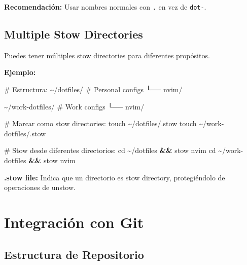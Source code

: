 \documentclass[
  doc,
  floatsintext,
  longtable,
  a4paper,
  nolmodern,
  notxfonts,
  notimes,
  12pt,
  colorlinks=true,linkcolor=blue,citecolor=blue,urlcolor=blue]{apa7}
\newenvironment{Shaded}{\begin{snugshade}}{\end{snugshade}}
\newcommand{\BuiltInTok}[1]{\textcolor[rgb]{0.00,0.23,0.31}{#1}}
\newcommand{\CommentTok}[1]{\textcolor[rgb]{0.37,0.37,0.37}{#1}}
\newcommand{\ExtensionTok}[1]{\textcolor[rgb]{0.00,0.23,0.31}{#1}}
\newcommand{\FunctionTok}[1]{\textcolor[rgb]{0.28,0.35,0.67}{#1}}
\newcommand{\KeywordTok}[1]{\textcolor[rgb]{0.00,0.23,0.31}{\textbf{#1}}}
\newcommand{\NormalTok}[1]{\textcolor[rgb]{0.00,0.23,0.31}{#1}}
\begin{document}
\textbf{Recomendación:} Usar nombres normales con \texttt{.} en vez de
\texttt{dot-}.

\subsection{Multiple Stow Directories}\label{multiple-stow-directories}

Puedes tener múltiples stow directories para diferentes propósitos.

\textbf{Ejemplo:}

\begin{Shaded}
\begin{Highlighting}[]
\CommentTok{\# Estructura:}
\ExtensionTok{\textasciitilde{}/dotfiles/}          \CommentTok{\# Personal configs}
  \ExtensionTok{└──}\NormalTok{ nvim/}

\ExtensionTok{\textasciitilde{}/work{-}dotfiles/}     \CommentTok{\# Work configs}
  \ExtensionTok{└──}\NormalTok{ nvim/}

\CommentTok{\# Marcar como stow directories:}
\FunctionTok{touch}\NormalTok{ \textasciitilde{}/dotfiles/.stow}
\FunctionTok{touch}\NormalTok{ \textasciitilde{}/work{-}dotfiles/.stow}

\CommentTok{\# Stow desde diferentes directorios:}
\BuiltInTok{cd}\NormalTok{ \textasciitilde{}/dotfiles }\KeywordTok{\&\&} \ExtensionTok{stow}\NormalTok{ nvim}
\BuiltInTok{cd}\NormalTok{ \textasciitilde{}/work{-}dotfiles }\KeywordTok{\&\&} \ExtensionTok{stow}\NormalTok{ nvim}
\end{Highlighting}
\end{Shaded}

\textbf{.stow file:} Indica que un directorio es stow directory,
protegiéndolo de operaciones de unstow.

\section{Integración con Git}\label{integraciuxf3n-con-git}

\subsection{Estructura de Repositorio}\label{estructura-de-repositorio}
\end{document}

